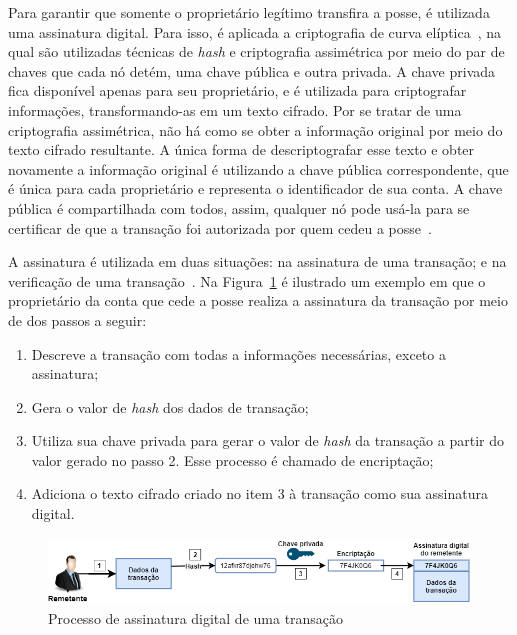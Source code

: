 Para garantir que somente o proprietário legítimo transfira a posse, é utilizada uma assinatura digital. Para isso, é aplicada a criptografia de curva elíptica~\cite{koblitz1987elliptic-curve}, na qual são utilizadas técnicas de \textit{hash} e criptografia assimétrica por meio do par de chaves que cada nó detém, uma chave pública e outra privada. A chave privada fica disponível apenas para seu proprietário, e é utilizada para criptografar informações, transformando-as em um texto cifrado. Por se tratar de uma criptografia assimétrica, não há como se obter a informação original por meio do texto cifrado resultante. A única forma de descriptografar esse texto e obter novamente a informação original é utilizando a chave pública correspondente, que é única para cada proprietário e representa o identificador de sua conta. A chave pública é compartilhada com todos, assim, qualquer nó pode usá-la para se certificar de que a transação foi autorizada por quem cedeu a posse~\cite{overview-blockchainbasic2018drescher}.

A assinatura é utilizada em duas situações: na assinatura de uma transação; e na verificação de uma transação~\cite{overview-blockchainbasic2018drescher}. Na Figura~\ref{fig:retemente-assinatura-digital} é ilustrado um exemplo em que o proprietário da conta que cede a posse realiza a assinatura da transação por meio de dos passos a seguir:
\begin{enumerate}
    \item Descreve a transação com todas a informações necessárias, exceto a assinatura;
    \item Gera o valor de \textit{hash} dos dados de transação;
    \item Utiliza sua chave privada para gerar o valor de \textit{hash} da transação a partir do valor gerado no passo 2. Esse processo é chamado de encriptação;
    \item Adiciona o texto cifrado criado no item 3 à transação como sua assinatura digital.
\end{enumerate}

\begin{figure}[htb]
 \caption{Processo de assinatura digital de uma transação}
 \label{fig:retemente-assinatura-digital}
 \centering
 \includegraphics[scale=0.5]{figuras/remetente_assinatura_digital.png}
\end{figure}

